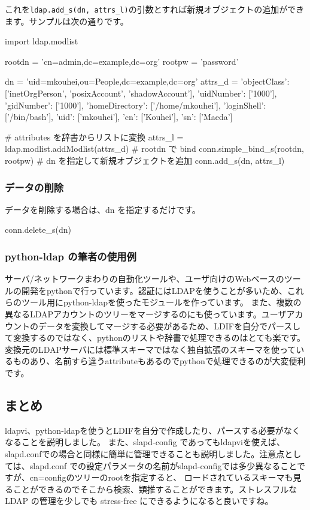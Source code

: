 \documentclass[mingoth,a4paper]{jsarticle}
\begin{document}
これを\texttt{ldap.add\_s(dn, attrs\_l)}の引数とすれば新規オブジェクトの追加ができます。サンプルは次の通りです。

\begin{commandline}
import ldap.modlist

rootdn = 'cn=admin,dc=example,dc=org'
rootpw = 'password'

dn = 'uid=mkouhei,ou=People,dc=example,dc=org'
attrs_d = {'objectClass': ['inetOrgPerson', 'posixAccount', 'shadowAccount'],
           'uidNumber': ['1000'],
           'gidNumber': ['1000'],
           'homeDirectory': ['/home/mkouhei'],
           'loginShell': ['/bin/bash'],
           'uid': ['mkouhei'],
           'cn': ['Kouhei'],
           'sn': ['Maeda']}

# attributes を辞書からリストに変換
attrs_l = ldap.modlist.addModlist(attrs_d)
# rootdn で bind
conn.simple_bind_s(rootdn, rootpw)
# dn を指定して新規オブジェクトを追加
conn.add_s(dn, attrs_l)
\end{commandline}

\subsubsection{データの削除}

データを削除する場合は、dn を指定するだけです。

\begin{commandline}
conn.delete_s(dn)
\end{commandline}

\subsubsection{python-ldap の筆者の使用例}
サーバ/ネットワークまわりの自動化ツールや、ユーザ向けのWebベースのツールの開発をpythonで行っています。認証にはLDAPを使うことが多いため、これらのツール用にpython-ldapを使ったモジュールを作っています。
また、複数の異なるLDAPアカウントのツリーをマージするのにも使っています。ユーザアカウントのデータを変換してマージする必要があるため、LDIFを自分でパースして変換するのではなく、pythonのリストや辞書で処理できるのはとても楽です。変換元のLDAPサーバには標準スキーマではなく独自拡張のスキーマを使っているものあり、名前すら違うattributeもあるのでpythonで処理できるのが大変便利です。

\subsection{まとめ}
ldapvi、python-ldapを使うとLDIFを自分で作成したり、パースする必要がなくなることを説明しました。 また、slapd-config であってもldapviを使えば、slapd.confでの場合と同様に簡単に管理できることも説明しました。注意点としては、slapd.conf での設定パラメータの名前がslapd-configでは多少異なることですが、cn=configのツリーのrootを指定すると、 ロードされているスキーマも見ることができるのでそこから検索、類推することができます。ストレスフルな LDAP の管理を少しでも stress-free にできるようになると良いですね。
\end{document}
